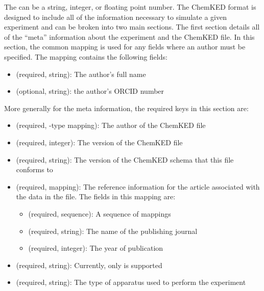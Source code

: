 \documentclass[12pt]{ussci}
\newcommand\ck{ChemKED}
\begin{document}
The  can be a string, integer, or floating point number. The \ck{}
format is designed to include all of the information necessary to simulate a
given experiment and can be broken into two main sections. The first section
details all of the ``meta'' information about the experiment and the \ck{} file.
In this section, the common  mapping is used for any fields where
an author must be specified. The  mapping contains the following
fields:
%
\begin{itemize}
    \item {} (required, string): The author's full name
    \item {} (optional, string): the author's ORCID number
\end{itemize}
%
More generally for the meta information, the required keys in this section
are:
%
\begin{itemize}
    \item {} (required, -type mapping): The
    author of the \ck{} file
    \item {} (required, integer): The version of the \ck{}
    file
    \item {} (required, string): The version of the \ck{}
    schema that this file conforms to
    \item {} (required, mapping): The reference information for
    the article associated with the data in the file. The fields in this
    mapping are:
    \begin{itemize}
        \item {} (required, sequence): A sequence of 
        mappings
        \item {} (required, string): The name of the publishing
        journal
        \item {} (required, integer): The year of publication
    \end{itemize}
    \item {} (required, string): Currently, only
     is supported
    \item {} (required, string): The type of apparatus used to
    perform the experiment
\end{itemize}
\end{document}
